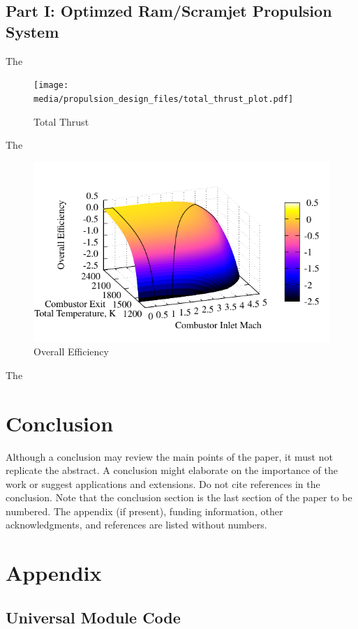 \documentclass[conf]{new-aiaa} %
\begin{document}
\subsection{Part I: Optimzed Ram/Scramjet Propulsion System}
The

\begin{figure}[hbt!]
\centering
\texttt{[image: media/propulsion\_design\_files/total\_thrust\_plot.pdf]}
\caption{\label{fig:partithrust} Total Thrust}
\end{figure}
The

\begin{figure}[hbt!]
\centering
\includegraphics[]{media/propulsion_design_files/eta_o_plot.pdf}
\caption{\label{fig:partietao} Overall Efficiency}
\end{figure}
The


\section{Conclusion}
Although a conclusion may review the main points of the paper, it must not replicate the abstract. A conclusion might elaborate on the importance of the work or suggest applications and extensions. Do not cite references in the conclusion. Note that the conclusion section is the last section of the paper to be numbered. The appendix (if present), funding information, other acknowledgments, and references are listed without numbers.


\section*{Appendix}

\subsection{Universal Module Code}
\end{document}
